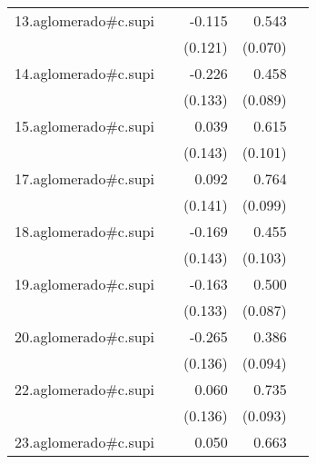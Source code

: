 {\begin{longtable}{l*{4}{D{.}{.}{-1}}}
\addlinespace
13.aglomerado#c.supi&                     &      -0.115         &       0.543\sym{***}&                     \\
            &                     &     (0.121)         &     (0.070)         &                     \\
\addlinespace
14.aglomerado#c.supi&                     &      -0.226         &       0.458\sym{***}&                     \\
            &                     &     (0.133)         &     (0.089)         &                     \\
\addlinespace
15.aglomerado#c.supi&                     &       0.039         &       0.615\sym{***}&                     \\
            &                     &     (0.143)         &     (0.101)         &                     \\
\addlinespace
17.aglomerado#c.supi&                     &       0.092         &       0.764\sym{***}&                     \\
            &                     &     (0.141)         &     (0.099)         &                     \\
\addlinespace
18.aglomerado#c.supi&                     &      -0.169         &       0.455\sym{***}&                     \\
            &                     &     (0.143)         &     (0.103)         &                     \\
\addlinespace
19.aglomerado#c.supi&                     &      -0.163         &       0.500\sym{***}&                     \\
            &                     &     (0.133)         &     (0.087)         &                     \\
\addlinespace
20.aglomerado#c.supi&                     &      -0.265         &       0.386\sym{***}&                     \\
            &                     &     (0.136)         &     (0.094)         &                     \\
\addlinespace
22.aglomerado#c.supi&                     &       0.060         &       0.735\sym{***}&                     \\
            &                     &     (0.136)         &     (0.093)         &                     \\
\addlinespace
23.aglomerado#c.supi&                     &       0.050         &       0.663\sym{***}&                     \\

\end{longtable}}
